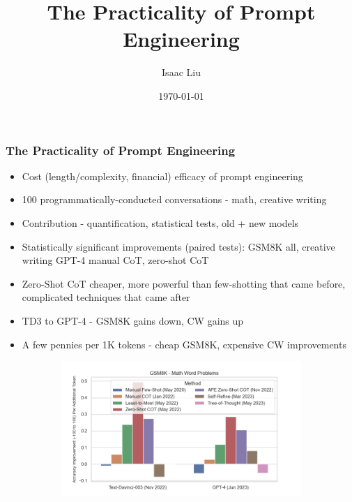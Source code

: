 \documentclass{beamer}
\title[The Practicality of Prompt Engineering]{The Practicality of Prompt Engineering}
\author{Isaac Liu}
\date{\today}
\begin{document}
    \begin{frame}
        \frametitle{The Practicality of Prompt Engineering}
        \begin{itemize}
            \scriptsize
            \item Cost (length/complexity, financial) efficacy of prompt engineering
            \item 100 programmatically-conducted conversations - math, creative writing
            \item Contribution - quantification, statistical tests, old + new models
            \item Statistically significant improvements (paired tests): GSM8K all, creative writing GPT-4 manual CoT, zero-shot CoT
            \item Zero-Shot CoT cheaper, more powerful than few-shotting that came before, complicated techniques that came after
            \item TD3 to GPT-4 - GSM8K gains down, CW gains up
            \item A few pennies per 1K tokens - cheap GSM8K, expensive CW improvements
        \end{itemize}
        \begin{figure}[h]
            \begin{subfigure}[h]{0.4925\textwidth}
                \centering
                \includegraphics[width=1.1\hsize]{../Output/gsm8k_change_in_accuracy_quality_per_change_in_conversation_length_sorted_by_technique_age.png} 
            \end{subfigure}
            \begin{subfigure}[h]{0.4925\textwidth}

\end{subfigure}
\end{figure}
\end{frame}
\end{document}
